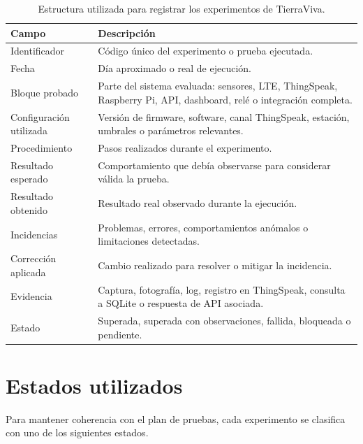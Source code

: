 \begin{table}[H]
\centering
\renewcommand{\arraystretch}{1.25}
\small
\begin{tabular}{|p{}|p{}|}
\hline
\rowcolor{gray!20}
\textbf{Campo} & \textbf{Descripción} \\
\hline
Identificador & Código único del experimento o prueba ejecutada. \\
\hline
Fecha & Día aproximado o real de ejecución. \\
\hline
Bloque probado & Parte del sistema evaluada: sensores, LTE, ThingSpeak, Raspberry Pi, API, dashboard, relé o integración completa. \\
\hline
Configuración utilizada & Versión de firmware, software, canal ThingSpeak, estación, umbrales o parámetros relevantes. \\
\hline
Procedimiento & Pasos realizados durante el experimento. \\
\hline
Resultado esperado & Comportamiento que debía observarse para considerar válida la prueba. \\
\hline
Resultado obtenido & Resultado real observado durante la ejecución. \\
\hline
Incidencias & Problemas, errores, comportamientos anómalos o limitaciones detectadas. \\
\hline
Corrección aplicada & Cambio realizado para resolver o mitigar la incidencia. \\
\hline
Evidencia & Captura, fotografía, log, registro en ThingSpeak, consulta a SQLite o respuesta de API asociada. \\
\hline
Estado & Superada, superada con observaciones, fallida, bloqueada o pendiente. \\
\hline
\end{tabular}
\caption{Estructura utilizada para registrar los experimentos de TierraViva.}
\label{tab:estructura_diario_experimentos}
\end{table}

\section{Estados utilizados}

Para mantener coherencia con el plan de pruebas, cada experimento se clasifica con uno de los siguientes estados.

